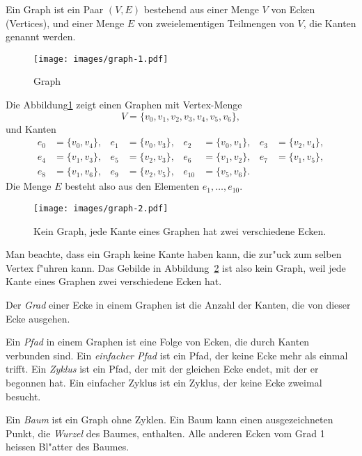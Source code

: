 \begin{definition}
\label{def_graph}
Ein Graph ist ein Paar $(V,E)$ bestehend aus einer Menge $V$ von Ecken
(Vertices),
und einer Menge $E$ von zweielementigen Teilmengen von $V$, die Kanten
genannt werden.
\end{definition}

\begin{figure}
\begin{center}
\texttt{[image: images/graph-1.pdf]}
\end{center}
\caption{Graph\label{grundlagen:graph}}
\end{figure}
Die Abbildung\ref{grundlagen:graph} zeigt einen Graphen mit Vertex-Menge
\[
V=\{v_0,
v_1,
v_2,
v_3,
v_4,
v_5,
v_6\},
\]
und Kanten
\begin{align*}
e_0&=\{v_0,v_4\},&
e_1&=\{v_0,v_3\},&
e_2&=\{v_0,v_1\},&
e_3&=\{v_2,v_4\},
\\
e_4&=\{v_1,v_3\},&
e_5&=\{v_2,v_3\},&
e_6&=\{v_1,v_2\},&
e_7&=\{v_1,v_5\},
\\
e_8&=\{v_1,v_6\},&
e_9&=\{v_2,v_5\},&
e_{10}&=\{v_5,v_6\}.
\end{align*}
Die Menge $E$ besteht also aus den Elementen $e_1,\dots,e_{10}$.

\begin{figure}
\begin{center}
\texttt{[image: images/graph-2.pdf]}
\end{center}
\caption{Kein Graph, jede Kante eines Graphen hat zwei verschiedene
Ecken.\label{grundlagen:keingraph}}
\end{figure}
Man beachte, dass ein Graph keine Kante haben kann, die zur"uck zum 
selben Vertex f"uhren kann.
Das Gebilde in Abbildung~\ref{grundlagen:keingraph}
ist also kein Graph, weil jede Kante eines Graphen zwei verschiedene
Ecken hat.

Der {\em Grad} einer Ecke in einem Graphen ist die Anzahl der Kanten,
die von dieser Ecke ausgehen.

Ein {\em Pfad} in einem Graphen ist eine Folge von Ecken, die durch Kanten
verbunden sind.
Ein {\em einfacher Pfad} ist ein Pfad, der keine Ecke mehr
als einmal trifft.
Ein {\em Zyklus} ist ein Pfad, der mit der gleichen Ecke
endet, mit der er begonnen hat.
Ein einfacher Zyklus ist ein Zyklus,
der keine Ecke zweimal besucht.

Ein {\em Baum} ist ein Graph ohne Zyklen. Ein Baum kann einen ausgezeichneten
Punkt, die {\em Wurzel} des Baumes, enthalten. Alle anderen Ecken vom Grad 1
heissen Bl"atter des Baumes.

